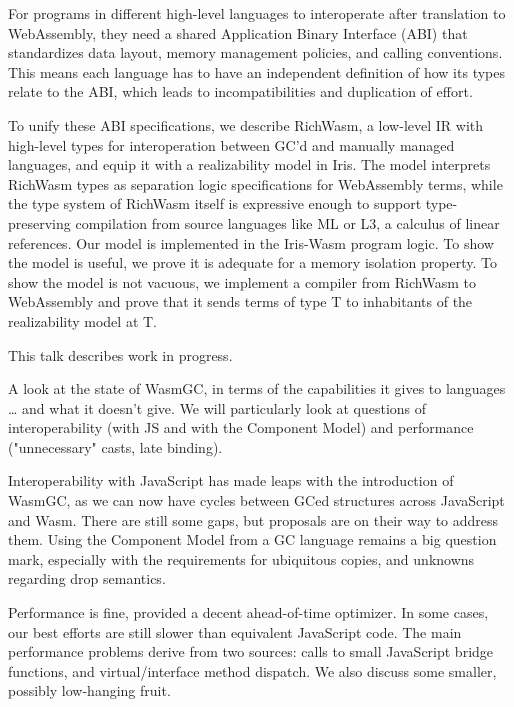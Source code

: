 \documentclass[a4paper,UKenglish]{dagrep-v2018}
\begin{document}
For programs in different high-level languages to interoperate after translation to WebAssembly, they need a shared Application Binary Interface (ABI) that standardizes data layout, memory management policies, and calling conventions. This means each language has to have an independent definition of how its types relate to the ABI, which leads to incompatibilities and duplication of effort.

To unify these ABI specifications, we describe RichWasm, a low-level IR with high-level types for interoperation between GC'd and manually managed languages, and equip it with a realizability model in Iris. The model interprets RichWasm types as separation logic specifications for WebAssembly terms, while the type system of RichWasm itself is expressive enough to support type-preserving compilation from source languages like ML or L3, a calculus of linear references. Our model is implemented in the Iris-Wasm program logic. To show the model is useful, we prove it is adequate for a memory isolation property. To show the model is not vacuous, we implement a compiler from RichWasm to WebAssembly and prove that it sends terms of type T to inhabitants of the realizability model at T.

This talk describes work in progress.

\license
{}

A look at the state of WasmGC, in terms of the capabilities it gives to languages … and what it doesn't give. We will particularly look at questions of interoperability (with JS and with the Component Model) and performance ("unnecessary" casts, late binding).

Interoperability with JavaScript has made leaps with the introduction of WasmGC, as we can now have cycles between GCed structures across JavaScript and Wasm. There are still some gaps, but proposals are on their way to address them. Using the Component Model from a GC language remains a big question mark, especially with the requirements for ubiquitous copies, and unknowns regarding drop semantics.

Performance is fine, provided a decent ahead-of-time optimizer. In some cases, our best efforts are still slower than equivalent JavaScript code. The main performance problems derive from two sources: calls to small JavaScript bridge functions, and virtual/interface method dispatch. We also discuss some smaller, possibly low-hanging fruit.
\end{document}
